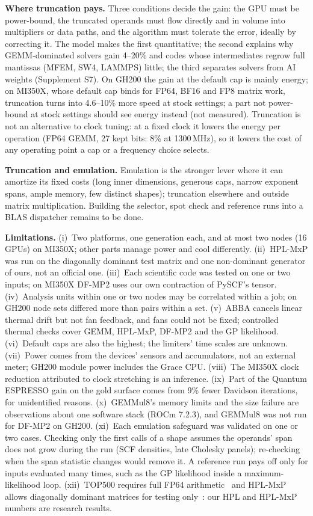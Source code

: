 \documentclass[conference]{IEEEtran}
\newcommand{\pct}{\%}
\begin{document}
\textbf{Where truncation pays.} Three conditions decide the gain: the GPU must be power-bound, the truncated operands
must flow directly and in volume into multipliers or data paths, and the algorithm must tolerate the error, ideally by
correcting it. The model makes the first quantitative; the second explains why GEMM-dominated solvers gain 4--20\pct{} and
codes whose intermediates regrow full mantissas (MFEM, SW4, LAMMPS) little; the third separates solvers from AI
weights (Supplement S7). On GH200 the gain at the default cap is mainly energy; on MI350X, whose default cap binds for FP64, BF16
and FP8 matrix work, truncation turns into 4.6--10\pct{} more speed at stock settings; a part not power-bound at stock settings should see energy instead (not measured). Truncation
is not an alternative to clock tuning: at a fixed clock it lowers the energy per operation (FP64 GEMM, 27 kept bits:
8\pct{} at 1300\,MHz), so it lowers the cost of any operating point a cap or a frequency choice selects.

\textbf{Truncation and emulation.} Emulation is the stronger lever where it can amortize its fixed costs (long inner
dimensions, generous caps, narrow exponent spans, ample memory, few distinct shapes); truncation elsewhere and outside
matrix multiplication. Building the selector, spot check and reference runs into a BLAS dispatcher remains to be done.

\textbf{Limitations.} (i)~Two platforms, one generation each, and at most two nodes (16 GPUs) on MI350X; other parts manage
power and cool differently. (ii)~HPL-MxP was run on the diagonally dominant test matrix and
one non-dominant generator of ours, not an official one. (iii)~Each scientific code was tested on one or two inputs; on MI350X DF-MP2 uses our own contraction of
PySCF's tensor. (iv)~Analysis units within one or two nodes may be correlated within a job; on GH200 node sets differed more than
pairs within a set. (v)~ABBA cancels linear thermal drift but not fan feedback, and fans could not be fixed; controlled thermal checks
cover GEMM, HPL-MxP, DF-MP2 and the GP likelihood. (vi)~Default caps are also the highest; the limiters' time scales are unknown.
(vii)~Power comes from the devices' sensors and accumulators, not an external meter; GH200 module power includes the
Grace CPU. (viii)~The MI350X clock reduction attributed to clock stretching is an inference. (ix)~Part of the Quantum ESPRESSO gain on the gold surface comes from 9\pct{} fewer Davidson iterations, for unidentified reasons. (x)~GEMMul8's
memory limits and the size failure are observations about one software stack (ROCm 7.2.3), and GEMMul8 was not run for
DF-MP2 on GH200. (xi)~Each emulation safeguard was validated on one or two cases. Checking only the first calls
of a shape assumes the operands' span does not grow during the run (SCF densities, late Cholesky panels); re-checking
when the span statistic changes would remove it. A reference run pays off only for inputs evaluated many times, such
as the GP likelihood inside a maximum-likelihood loop. (xii)~TOP500 requires full
FP64 arithmetic~\cite{TOP500Linpack} and HPL-MxP allows diagonally dominant matrices for testing only~\cite{HPLMxPRules}:
our HPL and HPL-MxP numbers are research results.
\end{document}
